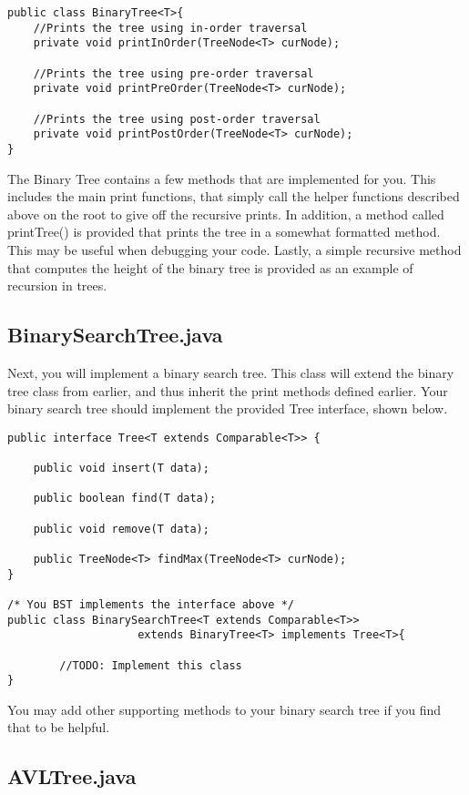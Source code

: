 \documentclass[paper=a4, fontsize=11pt, parskip=full]{scrartcl} %
\numberwithin{equation}{section} %
\numberwithin{figure}{section} %
\numberwithin{table}{section} %
\begin{document}
\begin{lstlisting}
public class BinaryTree<T>{
	//Prints the tree using in-order traversal
	private void printInOrder(TreeNode<T> curNode);
	
	//Prints the tree using pre-order traversal
	private void printPreOrder(TreeNode<T> curNode);
	
	//Prints the tree using post-order traversal
	private void printPostOrder(TreeNode<T> curNode);
}
\end{lstlisting}

The Binary Tree contains a few methods that are implemented for you. This includes the main print functions, that simply call the helper functions described above on the root to give off the recursive prints. In addition, a method called printTree() is provided that prints the tree in a somewhat formatted method. This may be useful when debugging your code. Lastly, a simple recursive method that computes the height of the binary tree is provided as an example of recursion in trees.

\subsection{BinarySearchTree.java}

Next, you will implement a binary search tree. This class will extend the binary tree class from earlier, and thus inherit the print methods defined earlier. Your binary search tree should implement the provided Tree interface, shown below. 

\begin{lstlisting}
public interface Tree<T extends Comparable<T>> {
	
	public void insert(T data);
	
	public boolean find(T data);

	public void remove(T data);

	public TreeNode<T> findMax(TreeNode<T> curNode);
}

/* You BST implements the interface above */
public class BinarySearchTree<T extends Comparable<T>>
					extends BinaryTree<T> implements Tree<T>{

		//TODO: Implement this class
}
\end{lstlisting}

You may add other supporting methods to your binary search tree if you find that to be helpful. 

\subsection{AVLTree.java}
\end{document}
